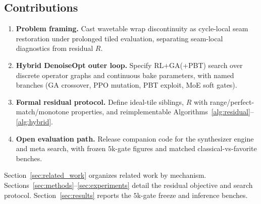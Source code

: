 \subsection{Contributions}
\label{sec:contributions}
\begin{enumerate}
  \item \textbf{Problem framing.} Cast wavetable wrap discontinuity as cycle-local seam restoration under prolonged tiled evaluation, separating seam-local diagnostics from residual $R$.
  \item \textbf{Hybrid DenoiseOpt outer loop.} Specify RL+GA(+PBT) search over discrete operator graphs and continuous bake parameters, with named branches (GA crossover, PPO mutation, PBT exploit, MoE soft gates).
  \item \textbf{Formal residual protocol.} Define ideal-tile siblings, $R$ with range/perfect-match/monotone properties, and reimplementable Algorithms~\ref{alg:residual}--\ref{alg:hybrid}.
  \item \textbf{Open evaluation path.} Release companion code for the synthesizer engine and meta search, with frozen $5$k-gate figures and matched classical-vs-favorite benches.
\end{enumerate}

Section~\ref{sec:related_work} organizes related work by mechanism.
Sections~\ref{sec:methods}--\ref{sec:experiments} detail the residual objective and search protocol.
Section~\ref{sec:results} reports the $5$k-gate freeze and inference benches.
